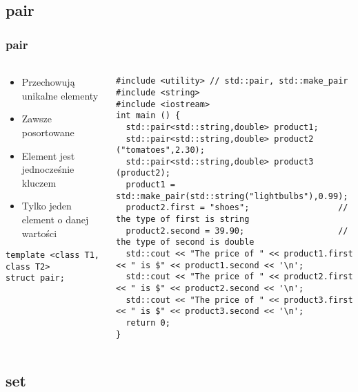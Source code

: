 \documentclass[10pt]{beamer}
\begin{document}
\subsection{pair}
\begin{frame}[fragile]
  \frametitle{pair}
  \framesubtitle{}
  \begin{columns}
    \begin{column}{0.5\textwidth}
    \begin{itemize}
      \item Przechowują unikalne elementy
      \item Zawsze posortowane
      \item Element jest jednocześnie kluczem
      \item Tylko jeden element o danej wartości
    \end{itemize}
    \begin{lstlisting}
template <class T1, class T2>
struct pair;
    \end{lstlisting}
    \end{column}
    \begin{column}{0.7\textwidth}
\begin{lstlisting}
#include <utility> // std::pair, std::make_pair
#include <string>
#include <iostream>
int main () {
  std::pair<std::string,double> product1;
  std::pair<std::string,double> product2 ("tomatoes",2.30);
  std::pair<std::string,double> product3 (product2);
  product1 = std::make_pair(std::string("lightbulbs"),0.99);
  product2.first = "shoes";                  // the type of first is string
  product2.second = 39.90;                   // the type of second is double
  std::cout << "The price of " << product1.first << " is $" << product1.second << '\n';
  std::cout << "The price of " << product2.first << " is $" << product2.second << '\n';
  std::cout << "The price of " << product3.first << " is $" << product3.second << '\n';
  return 0;
}
\end{lstlisting}
    \end{column}
  \end{columns}
\end{frame}

\subsection{set}
\end{document}
